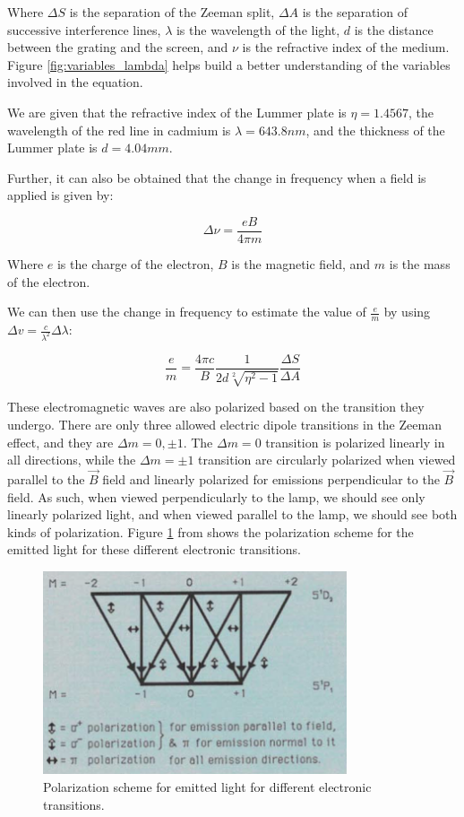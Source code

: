 Where $\Delta S$ is the separation of the Zeeman split, $\Delta A$ is the separation of successive interference lines, $\lambda$ is the wavelength of the light, $d$ is the distance between the grating and the screen, and $\nu$ is the refractive index of the medium.
Figure \ref{fig:variables_lambda} helps build a better understanding of the variables involved in the equation.

We are given that the refractive index of the Lummer plate is $\eta = 1.4567$, the wavelength of the red line in cadmium is $\lambda = 643.8 nm$, and the thickness of the Lummer plate is $d = 4.04 mm$.

Further, it can also be obtained that the change in frequency when a field is applied is given by:

\begin{equation}
    \Delta \nu = \frac{e B}{4\pi m}
\end{equation}

Where $e$ is the charge of the electron, $B$ is the magnetic field, and $m$ is the mass of the electron.

We can then use the change in frequency to estimate the value of $\frac{e}{m}$ by using $\Delta v = \frac{c}{\lambda^2} \Delta \lambda$:

\begin{equation} \label{eq:em_relationship}
    \frac{e}{m} =
    \frac{4 \pi c}{B} \frac{1}{2d\sqrt[2]{\eta^2 - 1}} \frac{\Delta S}{\Delta A}
\end{equation}

These electromagnetic waves are also polarized based on the transition they undergo. There are only three allowed electric dipole transitions in the Zeeman effect, and they are $\Delta m = 0, \pm1$. The $\Delta m = 0$ transition is polarized linearly in all directions, while the $\Delta m = \pm1$ transition are circularly polarized when viewed parallel to the $\vec{B}$ field and linearly polarized for emissions perpendicular to the $\vec{B}$ field. As such, when viewed perpendicularly to the lamp, we should see only linearly polarized light, and when viewed parallel to the lamp, we should see both kinds of polarization. Figure \ref{fig:polarization_scheme} from \cite{ZeemanEffectLab} shows the polarization scheme for the emitted light for these different electronic transitions.

\begin{figure}
    \centering
    \includegraphics[width=0.8\textwidth]{intro/polarization_scheme.png}
    \caption{Polarization scheme for emitted light for different electronic transitions.}
    \label{fig:polarization_scheme}
\end{figure}